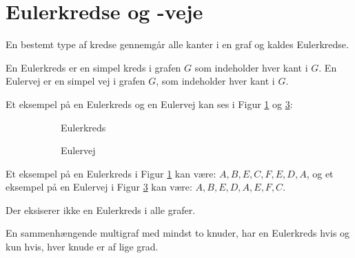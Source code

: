 \section{Eulerkredse og -veje}

En bestemt type af kredse gennemgår alle kanter i en graf og kaldes Eulerkredse. 

\begin{defn}\label{euler_def}
	En Eulerkreds er en simpel kreds i grafen $G$ som indeholder hver kant i $G$.
	En Eulervej er en simpel vej i grafen $G$, som indeholder hver kant i $G$.  
\end{defn}

\begin{exmp}
	Et eksempel på en Eulerkreds og en Eulervej kan ses i Figur \ref{euler_kreds} og \ref{euler_vej}: 

\begin{figure}[h]
\centering
	\begin{subfigure}{0.5\textwidth}
		\centering
			\scalebox{0.9}{}
		\caption{Eulerkreds} 
		\label{euler_kreds}
	\end{subfigure}%
	\begin{subfigure}{0.5\textwidth}
		\centering
			\scalebox{0.9}{}
		\caption{Eulervej} 
		\label{euler_vej}
	\end{subfigure}
\caption{}
\end{figure}
\end{exmp}


Et eksempel på en Eulerkreds i Figur \ref{euler_kreds} kan være: $A,B,E,C,F,E,D,A$, og
et eksempel på en Eulervej i Figur \ref{euler_vej} kan være: $A,B,E,D,A,E,F,C$.

Der eksiserer ikke en Eulerkreds i alle grafer.

\begin{thm}\label{Eulerkreds_multigraf}
	En sammenhængende multigraf med mindst to knuder, har en Eulerkreds hvis og kun hvis, hver knude er af lige grad.
\end{thm}

